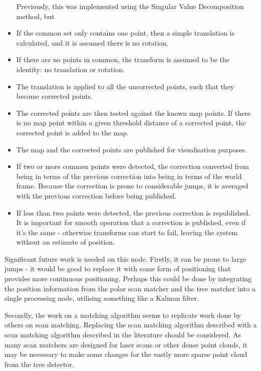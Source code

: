 \documentclass[12pt,oneside,a4paper]{book}
\begin{document}
\begin{itemize}
  Previously, this was implemented using the Singular Value
  Decomposition method, but 
\item If the common set only contains one point, then a simple
  translation is calculated, and it is assumed there is no rotation.
\item If there are no points in common, the transform is assumed to be
  the identity: no translation or rotation.
\item The translation is applied to all the uncorrected points, such
  that they become corrected points.
\item The corrected points are then tested against the known map
  points. If there is no map point within a given threshold distance
  of a corrected point, the corrected point is added to the map.
\item The map and the corrected points are published for visualisation
  purposes.
\item If two or more common points were detected, the correction
  converted from being in terms of the previous correction into being
  in terms of the world frame. Because the correction is prone to
  considerable jumps, it is averaged with the previous correction
  before being published. 
\item If less than two points were detected, the previous correction
  is republished. It is important for smooth operation that a
  correction is published, even if it's the same - otherwise
  transforms can start to fail, leaving the system without an estimate
  of position.
\end{itemize}

Significant future work is needed on this node.  Firstly, it can be
prone to large jumps - it would be good to replace it with some form
of positioning that provides more continuous positioning. Perhaps this
could be done by integrating the position information from the polar
scan matcher and the tree matcher into a single processing node,
utilising something like a Kalman filter.

Secondly, the work on a matching algorithm seems to replicate work
done by others on scan matching. Replacing the scan matching algorithm
described with a scan matching algorithm described in the literature
should be considered. As many scan matchers are designed for laser
scans or other dense point clouds, it may be necessary to make some
changes for the vastly more sparse point cloud from the tree detector.
\end{document}
